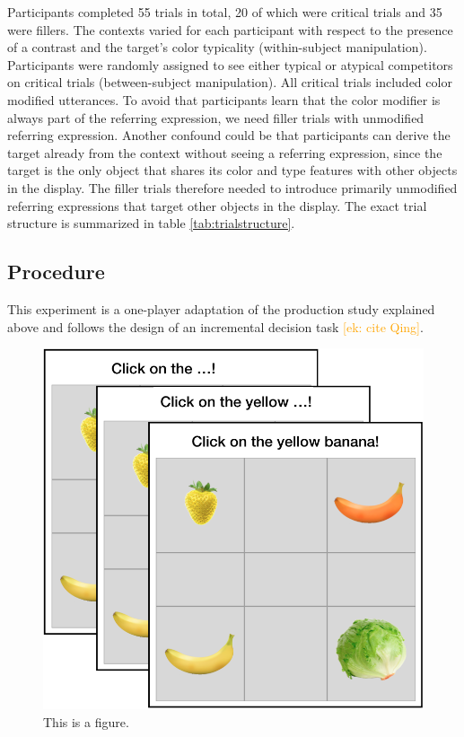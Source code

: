 \documentclass[10pt,letterpaper]{article}
\newcommand{\ek}[1]{\textcolor{Orange}{[ek: #1]}}
\begin{document}
Participants completed 55 trials in total, 20 of which were critical trials and 35 were fillers. The contexts varied for each participant with respect to the presence of a contrast and the target's color typicality (within-subject manipulation). Participants were randomly assigned to see either typical or atypical competitors on critical trials (between-subject manipulation). All critical trials included color modified utterances. To avoid that participants learn that the color modifier is always part of the referring expression, we need filler trials with unmodified referring expression. Another confound could be that participants can derive the target already from the context without seeing a referring expression, since the target is the only object that shares its color and type features with other objects in the display. The filler trials therefore needed to introduce primarily unmodified referring expressions that target other objects in the display. The exact trial structure is summarized in table \ref{tab:trialstructure}.


\subsection{Procedure}
This experiment is a one-player adaptation of the production study explained above and follows the design of an incremental decision task \ek{cite Qing}. 

\begin{figure}
	\begin{center}
		\includegraphics[width=.4\textwidth]{graphs/IDT-design.pdf}
	\end{center}
\caption{This is a figure.} 
\label{prod-results}
\end{figure}
\end{document}

